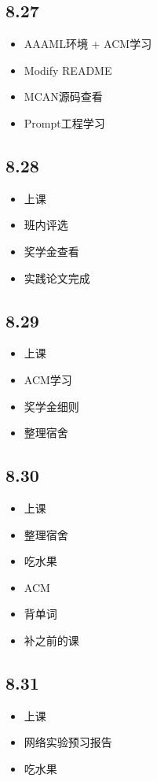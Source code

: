 \documentclass[UTF8]{ctexart}
\begin{document}
\subsection*{8.27}
\begin{itemize}
    \item AAAML环境 + ACM学习
    \item Modify README
    \item MCAN源码查看
    \item Prompt工程学习
\end{itemize}
\subsection*{8.28}
\begin{itemize}
    \item 上课
    \item 班内评选
    \item 奖学金查看
    \item 实践论文完成
\end{itemize}
\subsection*{8.29}
\begin{itemize}
    \item 上课
    \item ACM学习
    \item 奖学金细则
    \item 整理宿舍
\end{itemize}
\subsection*{8.30}
\begin{itemize}
    \item 上课
    \item 整理宿舍
    \item 吃水果
    \item ACM
    \item 背单词
    \item 补之前的课
\end{itemize}
\subsection*{8.31}
\begin{itemize}
    \item 上课
    \item 网络实验预习报告
    \item 吃水果
\end{itemize}
\end{document}
